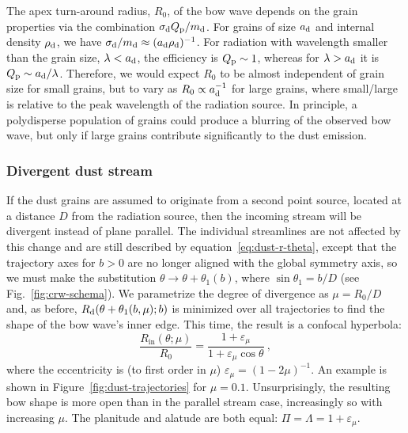 The apex turn-around radius, \(R_0\), of the bow wave depends on the
grain properties via the combination \(\sigma_{\text{d}} Q_{\text{p}} / m_{\text{d}}\).  For
grains of size \(a_{\text{d}}\) and internal density \(\rho_{\text{d}}\), we have
\(\sigma_{\text{d}} / m_{\text{d}} \approx (a_{\text{d}} \rho_{\text{d}})^{-1}\).  For radiation with
wavelength smaller than the grain size, \(\lambda < a_{\text{d}}\), the
efficiency is \(Q_{\text{p}} \sim 1\), whereas for \(\lambda > a_{\text{d}}\) it is
\(Q_{\text{p}} \sim a_{\text{d}}/\lambda\).  Therefore, we would expect \(R_0\) to be almost
independent of grain size for small grains, but to vary as
\(R_0 \propto a_{\text{d}}^{-1}\) for large grains, where small/large is relative
to the peak wavelength of the radiation source.  In principle, a
polydisperse population of grains could produce a blurring of the
observed bow wave, but only if large grains contribute significantly
to the dust emission.

\subsubsection{Divergent dust stream}
\label{sec:dust-divergent}

If the dust grains are assumed to originate from a second point
source, located at a distance \(D\) from the radiation source, then
the incoming stream will be divergent instead of plane parallel.  The
individual streamlines are not affected by this change and are still
described by equation~\eqref{eq:dust-r-theta}, except that the
trajectory axes for \(b > 0\) are no longer aligned with the global
symmetry axis, so we must make the substitution
\(\theta \to \theta + \theta_1(b)\), where \(\sin \theta_1 = b / D\) (see
Fig.~\ref{fig:crw-schema}). We parametrize the degree of divergence as
\(\mu = R_0 / D\) and, as before, \(R_{\text{d}}(\theta + \theta_1(b, \mu); b)\) is
minimized over all trajectories to find the shape of the bow wave's
inner edge.  This time, the result is a confocal hyperbola:
\begin{equation}
  \label{eq:dust-divergent-r-in}
  \frac{R_{\text{in}}(\theta; \mu)} {R_0} = \frac{1 + \varepsilon_\mu}{1 + \varepsilon_\mu\cos\theta} \ ,
\end{equation}
where the eccentricity is (to first order in \(\mu\))
\( \varepsilon_\mu = (1 - 2\mu)^{-1}\).  An example is shown in
Figure~\ref{fig:dust-trajectories} for \(\mu = 0.1\).  Unsurprisingly,
the resulting bow shape is more open than in the parallel stream case,
increasingly so with increasing \(\mu\).  The planitude and alatude are
both equal: \(\Pi = \Lambda = 1 + \varepsilon_\mu\).

